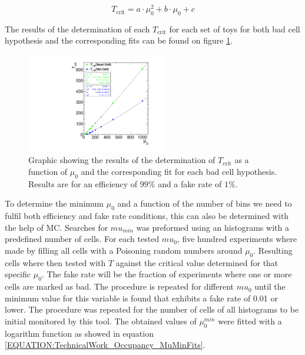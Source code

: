 \begin{equation}
T_{\text{crit}}=a \cdot \mu_0^2 + b \cdot \mu_0 + c
\label{EQUATION:TechnicalWork_Occupancy_Chi2Fits}
\end{equation}

The results of the determination of each $T_{\text{crit}}$ for each set of toys for both bad cell hypothesis and the corresponding fits can be found on figure \ref{FIGURE:TechnicalWork_L1TOccupancyTCrit}.

\begin{figure}[!htb]
\centering
\includegraphics[width=0.55\textwidth]{Chapter03/L1TOnline/Images/L1TOccupancy_TCrit.pdf}
\caption{Graphic showing the results of the determination of $T_{\text{crit}}$ as a function of $\mu_0$ and the corresponding fit for each bad cell hypothesis. Results are for an efficiency of $99\%$ and a fake rate of $1\%$.}
\label{FIGURE:TechnicalWork_L1TOccupancyTCrit}
\end{figure}

To determine the minimum $\mu_0$ and a function of the number of bins we need to fulfil both efficiency and fake rate conditions, this can also be determined with the help of \gls{MC}. Searches for $mu_{min}$ was preformed using an histograms with a predefined number of cells. For each tested $mu_{0}$, five hundred experiments where made by filling all cells with a Poisoning random numbers around $\mu_0$. Resulting cells where then tested with $T$ against the critical value determined for that specific $\mu_0$. The fake rate will be the fraction of experiments where one or more cells are marked as bad. The procedure is repeated for different $mu_{0}$ until the minimum value for this variable is found that exhibits a fake rate of 0.01 or lower. The procedure was repeated for the number of cells of all histograms to be initial monitored by this tool. The obtained values of $\mu_0^{min}$ were fitted with a logarithm function as showed in equation \ref{EQUATION:TechnicalWork_Occupancy_MuMinFits}.

